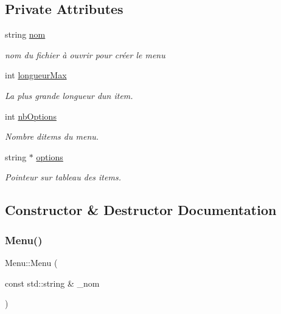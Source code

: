 \subsection*{Private Attributes}
\begin{DoxyCompactItemize}
\item 
string \hyperlink{class_menu_a99574cb51606811f697854859bc1ccc1}{nom}
\begin{DoxyCompactList}\small\item\em nom du fichier à ouvrir pour créer le menu \end{DoxyCompactList}\item 
int \hyperlink{class_menu_a745c540589015b573d8214e1080e2a8e}{longueur\+Max}
\begin{DoxyCompactList}\small\item\em La plus grande longueur d\textquotesingle{}un item. \end{DoxyCompactList}\item 
int \hyperlink{class_menu_ad59953635d184fefcddf95015a761187}{nb\+Options}
\begin{DoxyCompactList}\small\item\em Nombre d\textquotesingle{}items du menu. \end{DoxyCompactList}\item 
string $\ast$ \hyperlink{class_menu_aec975cfea9216420d5754ce2e9321390}{options}
\begin{DoxyCompactList}\small\item\em Pointeur sur tableau des items. \end{DoxyCompactList}\end{DoxyCompactItemize}


\subsection{Constructor \& Destructor Documentation}
\mbox{\label{class_menu_a0540324b94e45b51182db9a30393e27b}} 
\subsubsection{\texorpdfstring{Menu()}{Menu()}}
{\footnotesize\ttfamily Menu\+::\+Menu (\begin{DoxyParamCaption}\item[{const std\+::string \&}]{\+\_\+nom }\end{DoxyParamCaption})}



